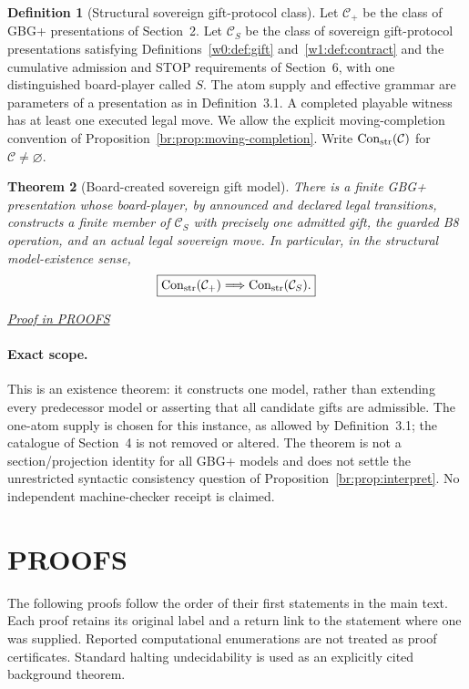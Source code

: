 \documentclass[11pt,letterpaper]{article}
\newtheorem{theorem}{Theorem}[section]
\theoremstyle{definition}\newtheorem{definition}[theorem]{Definition}\newtheorem{example}[theorem]{Example}
\theoremstyle{remark}\newtheorem{remark}[theorem]{Remark}
\newcommand{\Con}{\operatorname{Con}}
\newcommand{\proofat}[1]{\par\smallskip\noindent\hfill\textit{\hyperref[#1]{Proof in PROOFS}}}
\begin{document}
\begin{definition}[Structural sovereign gift-protocol class]\label{br:def:structural-class}
Let $\mathcal C_+$ be the class of GBG+ presentations of Section~2. Let $\mathcal C_S$ be the class of sovereign gift-protocol presentations satisfying Definitions~\ref{w0:def:gift} and~\ref{w1:def:contract} and the cumulative admission and STOP requirements of Section~6, with one distinguished board-player called $S$. The atom supply and effective grammar are parameters of a presentation as in Definition~3.1. A completed playable witness has at least one executed legal move. We allow the explicit moving-completion convention of Proposition~\ref{br:prop:moving-completion}. Write $\Con_{\rm str}(\mathcal C)$ for $\mathcal C\ne\varnothing$.
\end{definition}

\begin{theorem}[Board-created sovereign gift model]\label{br:th:board-created}
There is a finite GBG+ presentation whose board-player, by announced and declared legal transitions, constructs a finite member of $\mathcal C_S$ with precisely one admitted gift, the guarded B8 operation, and an actual legal sovereign move. In particular, in the structural model-existence sense,
\[
\boxed{\Con_{\rm str}(\mathcal C_+)\Longrightarrow\Con_{\rm str}(\mathcal C_S).}
\]
\end{theorem}
\proofat{br:pr:board-created}

\paragraph{Exact scope.} This is an existence theorem: it constructs one model, rather than extending every predecessor model or asserting that all candidate gifts are admissible. The one-atom supply is chosen for this instance, as allowed by Definition~3.1; the catalogue of Section~4 is not removed or altered. The theorem is not a section/projection identity for all GBG+ models and does not settle the unrestricted syntactic consistency question of Proposition~\ref{br:prop:interpret}. No independent machine-checker receipt is claimed.


\appendix
\section{PROOFS}
\label{sec:all-proofs}\label{w0:sec:proofs}
The following proofs follow the order of their first statements in the main
text. Each proof retains its original label and a return link to the
statement where one was supplied. Reported computational enumerations
are not treated as proof certificates. Standard halting undecidability
is used as an explicitly cited background theorem.
\end{document}
